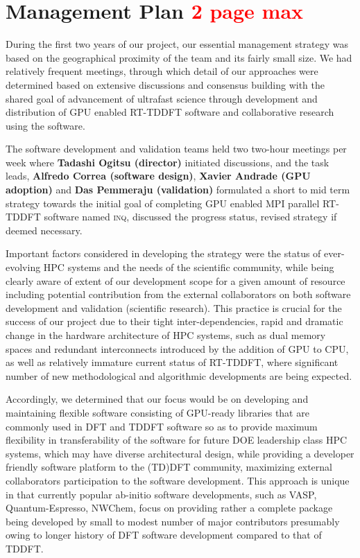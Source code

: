 \section{Management Plan \textcolor{red}{2 page max}}
\label{sec:manage}

During the first two years of our project, our essential management strategy was based on the geographical proximity of the team and its fairly small size. We had relatively frequent meetings, through which detail of our approaches were determined based on extensive discussions and consensus building with the shared goal of advancement of ultrafast science through development and distribution of GPU enabled RT-TDDFT software and collaborative research using the software. 

The software development and validation teams held two two-hour meetings per week where {\bf Tadashi Ogitsu (director)} initiated discussions, and the task leads, {\bf Alfredo Correa (software design)}, {\bf Xavier Andrade (GPU adoption)} and {\bf Das Pemmeraju (validation)} formulated a short to mid term strategy towards the initial goal of completing GPU enabled MPI parallel RT-TDDFT software named \textsc{inq}, discussed the progress status, revised strategy if deemed necessary.

Important factors considered in developing the strategy were the status of ever-evolving HPC systems and the needs of the scientific community, while being clearly aware of extent of our development scope for a given amount of resource including potential contribution from the external collaborators on both software development and validation (scientific research). 
This practice is crucial for the success of our project due to their tight inter-dependencies, rapid and dramatic change in the hardware architecture of HPC systems, such as dual memory spaces and redundant interconnects introduced by the addition of GPU to CPU, as well as relatively immature current status of RT-TDDFT, where significant number of new methodological and algorithmic developments are being expected. 

Accordingly, we determined that our focus would be on developing and maintaining flexible software consisting of GPU-ready libraries that are commonly used in DFT and TDDFT software so as to provide maximum flexibility in transferability of the software for future DOE leadership class HPC systems, which may have diverse architectural design, while providing a developer friendly software platform to the (TD)DFT community, maximizing external collaborators participation to the software development. 
This approach is unique in that currently popular ab-initio software developments, such as VASP, Quantum-Espresso, NWChem, focus on providing rather a complete package being developed by small to modest number of major contributors presumably owing to longer history of DFT software development compared to that of TDDFT.

